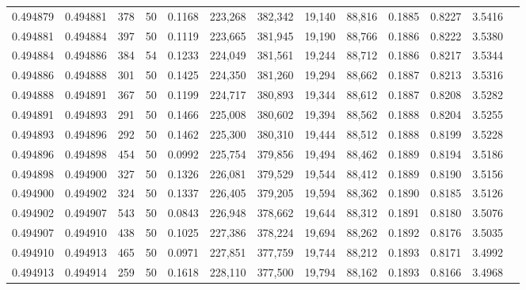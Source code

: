 \begin{tabular}{rrrrrrrrrrrrr}
0.494879 & 0.494881 &   378 &  50 &                                     0.1168 & 223,268 & 382,342 &  19,140 &  88,816 & 0.1885 & 0.8227 & 3.5416 \\
0.494881 & 0.494884 &   397 &  50 &                                     0.1119 & 223,665 & 381,945 &  19,190 &  88,766 & 0.1886 & 0.8222 & 3.5380 \\
0.494884 & 0.494886 &   384 &  54 &                                     0.1233 & 224,049 & 381,561 &  19,244 &  88,712 & 0.1886 & 0.8217 & 3.5344 \\
0.494886 & 0.494888 &   301 &  50 &                                     0.1425 & 224,350 & 381,260 &  19,294 &  88,662 & 0.1887 & 0.8213 & 3.5316 \\
0.494888 & 0.494891 &   367 &  50 &                                     0.1199 & 224,717 & 380,893 &  19,344 &  88,612 & 0.1887 & 0.8208 & 3.5282 \\
0.494891 & 0.494893 &   291 &  50 &                                     0.1466 & 225,008 & 380,602 &  19,394 &  88,562 & 0.1888 & 0.8204 & 3.5255 \\
0.494893 & 0.494896 &   292 &  50 &                                     0.1462 & 225,300 & 380,310 &  19,444 &  88,512 & 0.1888 & 0.8199 & 3.5228 \\
0.494896 & 0.494898 &   454 &  50 &                                     0.0992 & 225,754 & 379,856 &  19,494 &  88,462 & 0.1889 & 0.8194 & 3.5186 \\
0.494898 & 0.494900 &   327 &  50 &                                     0.1326 & 226,081 & 379,529 &  19,544 &  88,412 & 0.1889 & 0.8190 & 3.5156 \\
0.494900 & 0.494902 &   324 &  50 &                                     0.1337 & 226,405 & 379,205 &  19,594 &  88,362 & 0.1890 & 0.8185 & 3.5126 \\
0.494902 & 0.494907 &   543 &  50 &                                     0.0843 & 226,948 & 378,662 &  19,644 &  88,312 & 0.1891 & 0.8180 & 3.5076 \\
0.494907 & 0.494910 &   438 &  50 &                                     0.1025 & 227,386 & 378,224 &  19,694 &  88,262 & 0.1892 & 0.8176 & 3.5035 \\
0.494910 & 0.494913 &   465 &  50 &                                     0.0971 & 227,851 & 377,759 &  19,744 &  88,212 & 0.1893 & 0.8171 & 3.4992 \\
0.494913 & 0.494914 &   259 &  50 &                                     0.1618 & 228,110 & 377,500 &  19,794 &  88,162 & 0.1893 & 0.8166 & 3.4968 \\

\end{tabular}
